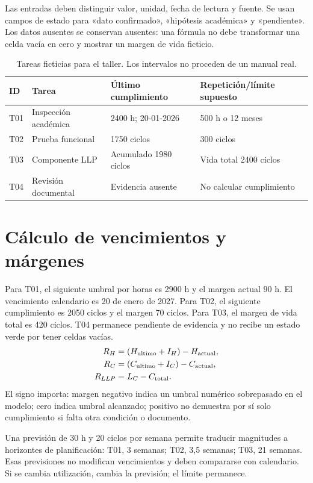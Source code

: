 Las entradas deben distinguir valor, unidad, fecha de lectura y fuente. Se usan campos de estado para «dato confirmado», «hipótesis académica» y «pendiente». Los datos ausentes se conservan ausentes: una fórmula no debe transformar una celda vacía en cero y mostrar un margen de vida ficticio.
\begin{table}[htbp]\centering\small\caption{Tareas ficticias para el taller. Los intervalos no proceden de un manual real.}\label{tab:taller}
\begin{tabular}{p{.1\linewidth}p{.26\linewidth}p{.23\linewidth}p{.25\linewidth}}\toprule
ID & Tarea & Último cumplimiento & Repetición/límite supuesto\\\midrule
T01 & Inspección académica & 2400 h; 20-01-2026 & 500 h o 12 meses\\[4pt]
T02 & Prueba funcional & 1750 ciclos & 300 ciclos\\[4pt]
T03 & Componente LLP & Acumulado 1980 ciclos & Vida total 2400 ciclos\\[4pt]
T04 & Revisión documental & Evidencia ausente & No calcular cumplimiento\\\bottomrule
\end{tabular}\end{table}
\section{Cálculo de vencimientos y márgenes}
Para T01, el siguiente umbral por horas es 2900 h y el margen actual 90 h. El vencimiento calendario es 20 de enero de 2027. Para T02, el siguiente cumplimiento es 2050 ciclos y el margen 70 ciclos. Para T03, el margen de vida total es 420 ciclos. T04 permanece pendiente de evidencia y no recibe un estado verde por tener celdas vacías.
\begin{align}
R_H&=(H_{\rm ultimo}+I_H)-H_{\rm actual},\\
R_C&=(C_{\rm ultimo}+I_C)-C_{\rm actual},\\
R_{LLP}&=L_C-C_{\rm total}.\label{eq:controlvida}
\end{align}
El signo importa: margen negativo indica un umbral numérico sobrepasado en el modelo; cero indica umbral alcanzado; positivo no demuestra por sí solo cumplimiento si falta otra condición o documento.

Una previsión de 30 h y 20 ciclos por semana permite traducir magnitudes a horizontes de planificación: T01, 3 semanas; T02, 3,5 semanas; T03, 21 semanas. Esas previsiones no modifican vencimientos y deben compararse con calendario. Si se cambia utilización, cambia la previsión; el límite permanece.
